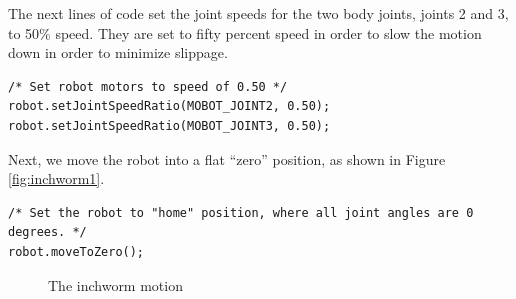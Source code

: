 \documentclass{article}
\begin{document}
The next lines of code set the joint speeds for the two body joints, joints 
2 and 3, to 50\% speed. They are set to fifty percent speed in order to 
slow the motion down in order to minimize slippage.

\begin{verbatim}
/* Set robot motors to speed of 0.50 */
robot.setJointSpeedRatio(MOBOT_JOINT2, 0.50);
robot.setJointSpeedRatio(MOBOT_JOINT3, 0.50);
\end{verbatim}

Next, we move the robot into a flat ``zero'' position, as shown in Figure \ref{fig:inchworm1}.

\begin{verbatim}
/* Set the robot to "home" position, where all joint angles are 0 degrees. */
robot.moveToZero();
\end{verbatim}

\begin{figure}
  \centering
  \caption{The inchworm motion}
  \label{fig:inchworm}
\end{figure}
\end{document}
